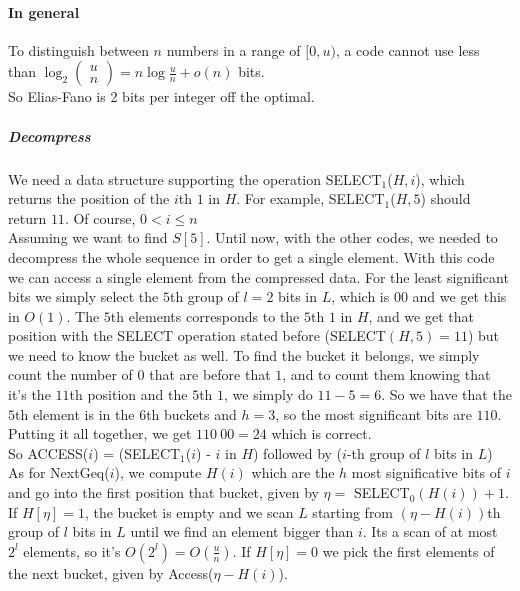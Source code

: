 \documentclass[10pt]{report}
\begin{document}
\paragraph{In general} To distinguish between $n$ numbers in a range of $[0, u)$, a code cannot use less than $\log_2\left(\begin{array}{c}
u\\n
\end{array}\right) = n\log\frac{u}{n} + o(n)$ bits.\\
So Elias-Fano is 2 bits per integer off the optimal.
\subparagraph{Decompress}
We need a data structure supporting the operation SELECT$_1$($H, i$), which returns the position of the $i$th $1$ in $H$. For example, SELECT$_1$($H, 5$) should return $11$. Of course, $0< i \leq n$\\
Assuming we want to find $S[5]$. Until now, with the other codes, we needed to decompress the whole sequence in order to get a single element. With this code we can access a single element from the compressed data. For the least significant bits we simply select the $5$th group of $l=2$ bits in $L$, which is $00$ and we get this in $O(1)$. The $5$th elements corresponds to the $5$th $1$ in $H$, and we get that position with the SELECT operation stated before (SELECT$(H,5)= 11$) but we need to know the bucket as well. To find the bucket it belongs, we simply count the number of $0$ that are before that $1$, and to count them knowing that it's the $11$th position and the $5$th $1$, we simply do $11-5=6$. So we have that the $5$th element is in the $6$th buckets and $h=3$, so the most significant bits are $110$. Putting it all together, we get $110\:00 = 24$ which is correct.\\
So ACCESS($i$) = (SELECT$_1$($i$) - $i$ in $H$) followed by ($i$-th group of $l$ bits in $L$)\\
As for NextGeq($i$), we compute $H(i)$ which are the $h$ most significative bits of $i$ and go into the first position that bucket, given by $\eta =$ SELECT$_0(H(i)) + 1$. If $H[\eta] = 1$, the bucket is empty and we scan $L$ starting from $(\eta - H(i))$th group of $l$ bits in $L$ until we find an element bigger than $i$. Its a scan of at most $2^l$ elements, so it's $O(2^l) = O(\frac{u}{n})$. If $H[\eta]=0$ we pick the first elements of the next bucket, given by Access($\eta - H(i)$).
\end{document}
